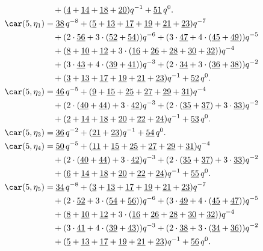 \begin{align*}
	&\quad+(\underline{4}+\underline{14}+\underline{18}+\underline{20})q^{-1}+\underline{51}\,q^0.\\
	\car(5,\eta_{1})
	&=\underline{38}\,q^{-8}+(\underline{5}+\underline{13}+\underline{17}+\underline{19}+\underline{21}+\underline{23})q^{-7}\\
	&\quad+(2\cdot\underline{56}+3\cdot(\underline{52}+\underline{54}))q^{-6}+(3\cdot\underline{47}+4\cdot(\underline{45}+\underline{49}))q^{-5}\\
	&\quad+(\underline{8}+\underline{10}+\underline{12}+3\cdot(\underline{16}+\underline{26}+\underline{28}+\underline{30}+\underline{32}))q^{-4}\\
	&\quad+(3\cdot\underline{43}+4\cdot(\underline{39}+\underline{41}))q^{-3}+(2\cdot\underline{34}+3\cdot(\underline{36}+\underline{38}))q^{-2}\\
	&\quad+(\underline{3}+\underline{13}+\underline{17}+\underline{19}+\underline{21}+\underline{23})q^{-1}+\underline{52}\,q^0.\\
	\car(5,\eta_{2})
	&=\underline{46}\,q^{-5}+(\underline{9}+\underline{15}+\underline{25}+\underline{27}+\underline{29}+\underline{31})q^{-4}\\
	&\quad+(2\cdot(\underline{40}+\underline{44})+3\cdot\underline{42})q^{-3}+(2\cdot(\underline{35}+\underline{37})+3\cdot\underline{33})q^{-2}\\
	&\quad+(\underline{2}+\underline{14}+\underline{18}+\underline{20}+\underline{22}+\underline{24})q^{-1}+\underline{53}\,q^0.\\
	\car(5,\eta_{3})
	&=\underline{36}\,q^{-2}+(\underline{21}+\underline{23})q^{-1}+\underline{54}\,q^0.\\
	\car(5,\eta_{4})
	&=\underline{50}\,q^{-5}+(\underline{11}+\underline{15}+\underline{25}+\underline{27}+\underline{29}+\underline{31})q^{-4}\\
	&\quad+(2\cdot(\underline{40}+\underline{44})+3\cdot\underline{42})q^{-3}+(2\cdot(\underline{35}+\underline{37})+3\cdot\underline{33})q^{-2}\\
	&\quad+(\underline{6}+\underline{14}+\underline{18}+\underline{20}+\underline{22}+\underline{24})q^{-1}+\underline{55}\,q^0.\\
	\car(5,\eta_{5})
	&=\underline{34}\,q^{-8}+(\underline{3}+\underline{13}+\underline{17}+\underline{19}+\underline{21}+\underline{23})q^{-7}\\
	&\quad+(2\cdot\underline{52}+3\cdot(\underline{54}+\underline{56}))q^{-6}+(3\cdot\underline{49}+4\cdot(\underline{45}+\underline{47}))q^{-5}\\
	&\quad+(\underline{8}+\underline{10}+\underline{12}+3\cdot(\underline{16}+\underline{26}+\underline{28}+\underline{30}+\underline{32}))q^{-4}\\
	&\quad+(3\cdot\underline{41}+4\cdot(\underline{39}+\underline{43}))q^{-3}+(2\cdot\underline{38}+3\cdot(\underline{34}+\underline{36}))q^{-2}\\
	&\quad+(\underline{5}+\underline{13}+\underline{17}+\underline{19}+\underline{21}+\underline{23})q^{-1}+\underline{56}\,q^0.
\end{align*}

